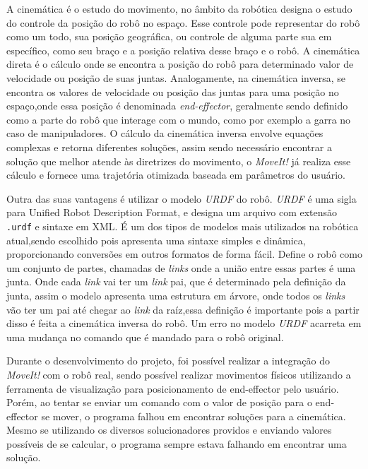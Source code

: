 A cinemática é o estudo do movimento, no âmbito da robótica designa o estudo do controle da posição do robô no espaço. Esse controle pode representar do robô como um todo, sua posição geográfica, ou controle de alguma parte sua em específico, como seu braço e a posição relativa desse braço e o robô.  A cinemática direta é o cálculo onde se encontra a posição do robô para determinado valor de velocidade ou posição de suas juntas. Analogamente, na cinemática inversa, se encontra os valores de velocidade ou posição das juntas para uma posição no espaço,onde essa posição é denominada \textit{end-effector}, geralmente sendo definido como a parte do robô que interage com o mundo, como por exemplo a garra no caso de manipuladores. O cálculo da cinemática inversa envolve equações complexas e retorna diferentes soluções, assim sendo necessário encontrar a solução que melhor atende às diretrizes do movimento, o \textit{MoveIt!} já realiza esse cálculo e fornece uma trajetória otimizada baseada em parâmetros do usuário.

Outra das suas vantagens é utilizar o modelo \textit{URDF} do robô. \textit{URDF} é uma sigla para Unified Robot Description Format, e designa um arquivo com extensão \verb|.urdf| e sintaxe em XML. É um dos tipos de modelos mais utilizados na robótica atual,sendo escolhido pois apresenta uma sintaxe simples e dinâmica, proporcionando conversões em outros formatos de forma fácil. Define o robô como um conjunto de partes, chamadas de \textit{links} onde a união entre essas partes é uma junta. Onde cada \textit{link} vai ter um \textit{link} pai, que é determinado pela definição da junta, assim o modelo apresenta uma estrutura em árvore, onde todos os \textit{links} vão ter um pai até chegar ao \textit{link} da raíz,essa definição é importante pois a partir disso é feita a cinemática inversa do robô. Um erro no modelo \textit{URDF} acarreta em uma mudança no comando que é mandado para o robô original.

Durante o desenvolvimento do projeto, foi possível realizar a integração do \textit{MoveIt!} com o robô real, sendo possível realizar movimentos físicos utilizando a ferramenta de visualização para posicionamento de end-effector pelo usuário. Porém, ao tentar se enviar um comando com o valor de posição para o end-effector se mover, o programa falhou em encontrar soluções para a cinemática. Mesmo se utilizando os diversos solucionadores providos e enviando valores possíveis de se calcular, o programa sempre estava falhando em encontrar uma solução.


